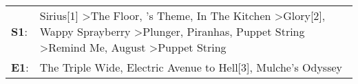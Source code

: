 \begin{supertabular}{p{0.03\textwidth}p{0.92\textwidth}}
 \textbf{S1}:  &  Sirius[1]\textsuperscript{} \textgreater \enspace The Floor\textsuperscript{}, 's Theme\textsuperscript{}, \enspace In The Kitchen\textsuperscript{} \textgreater \enspace Glory[2]\textsuperscript{}, \enspace Wappy Sprayberry\textsuperscript{} \textgreater \enspace Plunger\textsuperscript{}, \enspace Piranhas\textsuperscript{}, \enspace Puppet String\textsuperscript{} \textgreater \enspace Remind Me\textsuperscript{}, \enspace August\textsuperscript{} \textgreater \enspace Puppet String\textsuperscript{}  \enspace  \\
 \textbf{E1}:  &                                                                                                                                                                                                                                                                                                                                                                                                    The Triple Wide\textsuperscript{}, \enspace Electric Avenue to Hell[3]\textsuperscript{}, \enspace Mulche's Odyssey\textsuperscript{}  \enspace  \\
\end{supertabular}
